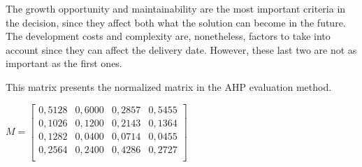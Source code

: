\begin{table}[ht]
\caption{AHP Evaluation Table}
\label{tab:ahpEvaluation}
\end{table}

The growth opportunity and maintainability are the most important criteria in the decision, since they affect both what the solution can become in the future. The development costs and complexity are, nonetheless, factors to take into account since they can affect the delivery date. However, these last two are not as important as the first ones. 
\par

This matrix presents the normalized matrix in the \gls{AHP} evaluation method.

$M =
\begin{bmatrix}
0,5128 & 0,6000 & 0,2857 & 0,5455 \\
0,1026 & 0,1200 & 0,2143 & 0,1364 \\
0,1282 & 0,0400 & 0,0714 & 0,0455 \\
0,2564 & 0,2400 & 0,4286 & 0,2727 \\
\end{bmatrix}$

